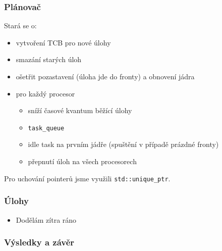 \documentclass{beamer}
\begin{document}
\begin{frame}
\frametitle{Plánovač}

Stará se o:
\begin{itemize}
  \item vytvoření TCB pro nové úlohy
  \item smazání starých úloh
  \item ošetřit pozastavení (úloha jde do fronty) a obnovení jádra
  \item pro každý procesor
  \begin{itemize}
    \item sníží časové kvantum běžící úlohy
    \item \texttt{task\_queue}
    \item idle task na prvním jádře (spuštění v případě prázdné fronty)
    \item přepnutí úloh na všech procesorech
  \end{itemize}

\end{itemize}
Pro uchování pointerů jsme využili \texttt{std::unique\_ptr}.
\end{frame}

\begin{frame} %
\frametitle{Úlohy}
\begin{itemize}
\item Dodělám zítra ráno
\end{itemize}
\end{frame}

\begin{frame} 
\frametitle{Výsledky a závěr}

\end{frame}
\end{document}
